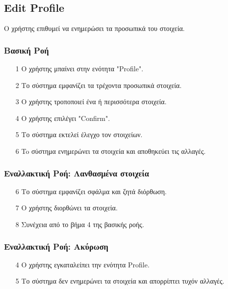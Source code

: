 \subsection{Edit Profile}

Ο χρήστης επιθυμεί να ενημερώσει τα προσωπικά του στοιχεία.

\subsubsection{Βασική Ροή}

\begin{enumerate}
    \item[1] Ο χρήστης μπαίνει στην ενότητα "Profile".
    \item[2] Το σύστημα εμφανίζει τα τρέχοντα προσωπικά στοιχεία.
    \item[3] Ο χρήστης τροποποιεί ένα ή περισσότερα στοιχεία.
    \item[4] Ο χρήστης επιλέγει "Confirm".
    \item[5] Το σύστημα εκτελεί έλεγχο τον στοιχείων.
    \item[6] To σύστημα ενημερώνει τα στοιχεία και αποθηκεύει τις αλλαγές.
\end{enumerate}

\subsubsection{Εναλλακτική Ροή: Λανθασμένα στοιχεία}

\begin{enumerate}
    \item[6] Το σύστημα εμφανίζει σφάλμα και ζητά διόρθωση.
    \item[7] Ο χρήστης διορθώνει τα στοιχεία.
    \item[8] Συνέχεια από το βήμα 4 της βασικής ροής.
\end{enumerate}

\subsubsection{Εναλλακτική Ροή: Ακύρωση}

\begin{enumerate}
    \item[4] Ο χρήστης εγκαταλείπει την ενότητα Profile.
    \item[5] Το σύστημα δεν ενημερώνει τα στοιχεία και απορρίπτει τυχόν αλλαγές.
\end{enumerate}
